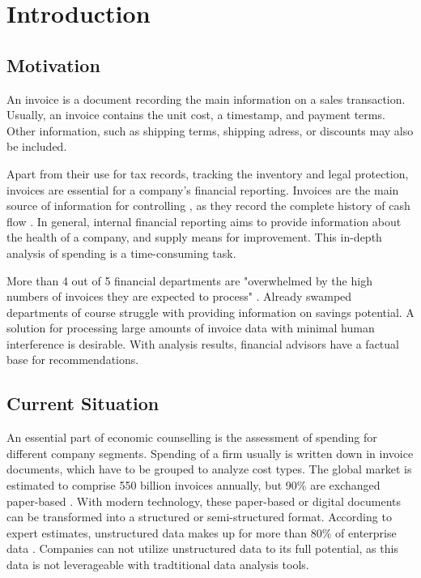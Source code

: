 \chapter{Introduction}
\section{Motivation}

An invoice is a document recording the main information on a sales transaction. Usually, an invoice contains the unit cost, a timestamp, and payment terms. Other information, such as shipping terms, shipping adress, or discounts may also be included.

Apart from their use for tax records, tracking the inventory and legal protection, invoices are essential for a company's financial reporting. Invoices are the main source of information for controlling \cite{investopediaInvoices}, as they record the complete history of cash flow \cite{invoicesPurpose}. In general, internal financial reporting aims to provide information about the health of a company, and supply means for improvement. This in-depth analysis of spending is a time-consuming task.

More than 4 out of 5 financial departments are "overwhelmed by the high numbers of invoices they are expected to process"  \cite{manualInvoiceProcessing}. Already swamped departments of course struggle with providing information on savings potential. A solution for processing large amounts of invoice data with minimal human interference is desirable. With analysis results, financial advisors have a factual base for recommendations.

\section{Current Situation}
An essential part of economic counselling is the assessment of spending for different company segments. Spending of a firm usually is written down in invoice documents, which have to be grouped  to analyze cost types.
The global market is estimated to comprise 550 billion invoices annually, but 90\% are exchanged paper-based \cite{kochEInvoicingJourney}. With modern technology, these paper-based or digital documents can be transformed into a structured or semi-structured format. According to expert estimates, unstructured data makes up for more than 80\% of enterprise data \cite{structuredAndUnstructuredData}. Companies can not utilize unstructured data to its full potential, as this data is not leverageable with tradtitional data analysis tools.

